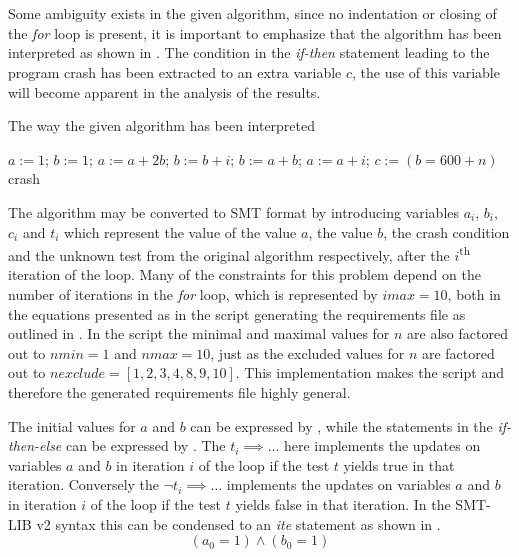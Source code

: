 \chapter{}\label{chp:4}
Some ambiguity exists in the given algorithm, since no indentation or closing of the \textit{for} loop is present, it is important to emphasize that the algorithm has been interpreted as shown in . The condition in the \textit{if-then} statement leading to the program crash has been extracted to an extra variable $c$, the use of this variable will become apparent in the analysis of the results.
\begin{algorithm}
  \caption{The way the given algorithm has been interpreted}
  \label{alg:4_improved}
  \begin{algorithmic}[1]
    \State $a := 1$;
    \State $b := 1$;
        \State $a := a + 2b$;
        \State $b := b + i$;
      \Else
        \State $b := a + b$;
        \State $a := a + i$;
      \EndIf
      \State $c := (b = 600 + n)$
        \State crash
      \EndIf
    \EndFor
  \end{algorithmic}
\end{algorithm}

The algorithm may be converted to SMT format by introducing variables $a_{i}$, $b_{i}$, $c_{i}$ and $t_{i}$ which represent the value of the value $a$, the value $b$, the crash condition and the unknown test from the original algorithm respectively, after the $i$\textsuperscript{th} iteration of the loop. Many of the constraints for this problem depend on the number of iterations in the \textit{for} loop, which is represented by $imax = 10$, both in the equations presented as in the script generating the requirements file as outlined in . In the script the minimal and maximal values for $n$ are also factored out to $nmin = 1$ and $nmax = 10$, just as the excluded values for $n$ are factored out to $nexclude = [1, 2, 3, 4, 8, 9, 10]$. This implementation makes the script and therefore the generated requirements file highly general.

The initial values for $a$ and $b$ can be expressed by , while the statements in the \textit{if-then-else} can be expressed by . The $t_{i} \implies \ldots$ here implements the updates on variables $a$ and $b$ in iteration $i$ of the loop if the test $t$ yields true in that iteration. Conversely the $\neg t_{i} \implies \ldots$ implements the updates on variables $a$ and $b$ in iteration $i$ of the loop if the test $t$ yields false in that iteration. In the SMT-LIB v2 syntax this can be condensed to an \textit{ite} statement as shown in .
\begin{equation}
  \label{eqn:4_initial}
  (a_{0} = 1) \wedge (b_{0} = 1)
\end{equation}


